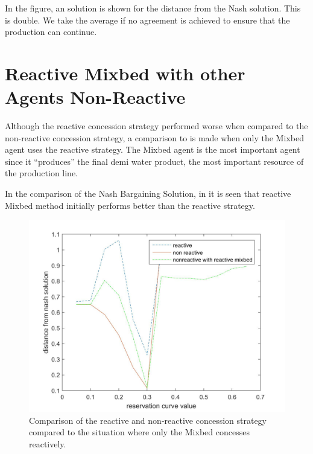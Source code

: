 In the figure, an solution is shown for the distance from the Nash solution. This is double. We take the average if no agreement is achieved to ensure that the production can continue. 
\clearpage
\section{Reactive Mixbed with other Agents Non-Reactive }
Although the reactive concession strategy performed worse when compared to the non-reactive concession strategy, a comparison to is made when only the Mixbed agent uses the reactive strategy. The Mixbed agent is the most important agent since it ``produces'' the final demi water product, the most important resource of the production line.

In the comparison of the Nash Bargaining Solution, in  it is seen that reactive Mixbed  method initially performs better than the reactive strategy. 


\begin{figure}[h]
	\centering
	\includegraphics[width=0.9\linewidth]{img/reactivevsnonreactivevsMixbedrea}
	\caption{Comparison of the reactive and non-reactive concession strategy compared to the situation where only the Mixbed concesses reactively.}
	\label{fig:reactivevsnon-reactivevsnon-reactivemxbrea}
\end{figure}

